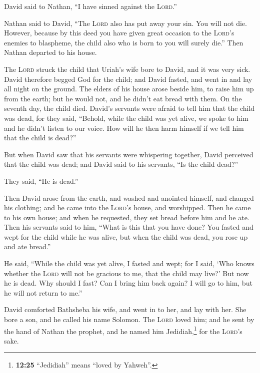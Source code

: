  David said to Nathan, ``I have sinned against the
\textsc{Lord}.''

Nathan said to David, ``The \textsc{Lord} also has put away your sin.
You will not die.  However, because by this deed you have
given great occasion to the \textsc{Lord}'s enemies to blaspheme, the
child also who is born to you will surely die.''  Then
Nathan departed to his house.

The \textsc{Lord} struck the child that Uriah's wife bore to David, and
it was very sick.  David therefore begged God for the
child; and David fasted, and went in and lay all night on the ground.
 The elders of his house arose beside him, to raise him
up from the earth; but he would not, and he didn't eat bread with them.
 On the seventh day, the child died. David's servants
were afraid to tell him that the child was dead, for they said,
``Behold, while the child was yet alive, we spoke to him and he didn't
listen to our voice. How will he then harm himself if we tell him that
the child is dead?''

 But when David saw that his servants were whispering
together, David perceived that the child was dead; and David said to his
servants, ``Is the child dead?''

They said, ``He is dead.''

 Then David arose from the earth, and washed and anointed
himself, and changed his clothing; and he came into the \textsc{Lord}'s
house, and worshipped. Then he came to his own house; and when he
requested, they set bread before him and he ate.  Then
his servants said to him, ``What is this that you have done? You fasted
and wept for the child while he was alive, but when the child was dead,
you rose up and ate bread.''

 He said, ``While the child was yet alive, I fasted and
wept; for I said, `Who knows whether the \textsc{Lord} will not be
gracious to me, that the child may live?'  But now he is
dead. Why should I fast? Can I bring him back again? I will go to him,
but he will not return to me.''

 David comforted Bathsheba his wife, and went in to her,
and lay with her. She bore a son, and he called his name Solomon. The
\textsc{Lord} loved him;  and he sent by the hand of
Nathan the prophet, and he named him Jedidiah,\footnote{\textbf{12:25}
  ``Jedidiah'' means ``loved by Yahweh''.} for the \textsc{Lord}'s sake.

